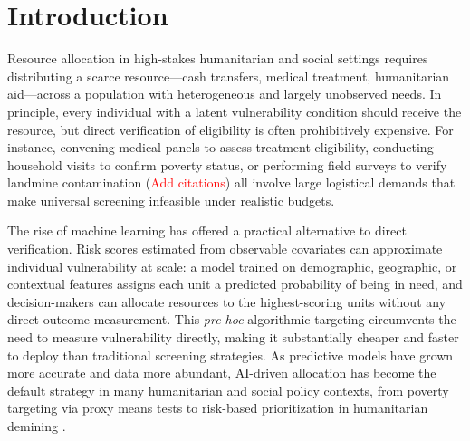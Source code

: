 \section{Introduction}

Resource allocation in high-stakes humanitarian and social settings requires distributing a scarce resource---cash transfers, medical treatment, humanitarian aid---across a population with heterogeneous and largely unobserved needs. In principle, every individual with a latent vulnerability condition should receive the resource, but direct verification of eligibility is often prohibitively expensive. For instance, convening medical panels to assess treatment eligibility, conducting household visits to confirm poverty status, or performing field surveys to verify landmine contamination \cite{} (\textcolor{red}{Add citations}) all involve large logistical demands that make universal screening infeasible under realistic budgets.

The rise of machine learning has offered a practical alternative to direct verification. Risk scores estimated from observable covariates can approximate individual vulnerability at scale: a model trained on demographic, geographic, or contextual features assigns each unit a predicted probability of being in need, and decision-makers can allocate resources to the highest-scoring units without any direct outcome measurement. This \textit{pre-hoc} algorithmic targeting circumvents the need to measure vulnerability directly, making it substantially cheaper and faster to deploy than traditional screening strategies. As predictive models have grown more accurate and data more abundant, AI-driven allocation has become the default strategy in many humanitarian and social policy contexts, from poverty targeting via proxy means tests \cite{grosh1995proxy, aiken2022machine} to risk-based prioritization in humanitarian demining \cite{dulce2024reland, cirillo2024desk}.

